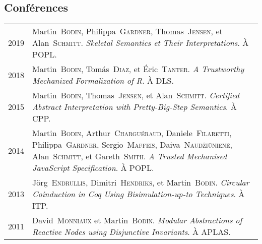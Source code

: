 \documentclass[12pt,a4paper]{article}
\makeatletter
\newenvironment{datecvsection}[1]%
               {\subsection*{#1}%
                 \noindent \begin{tabular}{@{}p{\annee}p{\texte}@{}}}
               {\end{tabular}}
\newcommand\familyName{\textsc}
\makeatother
\begin{document}
\begin{datecvsection}{Conférences}

  2019 & Martin~\familyName{Bodin}, Philippa~\familyName{Gardner}, Thomas~\familyName{Jensen}, et Alan~\familyName{Schmitt}. \textit{Skeletal Semantics et Their Interpretations}. À POPL. \\

  2018 & Martin~\familyName{Bodin}, Tomás~\familyName{Diaz}, et Éric~\familyName{Tanter}. \textit{A Trustworthy Mechanized Formalization of R}. À DLS. \\

  2015 & Martin~\familyName{Bodin}, Thomas~\familyName{Jensen}, et Alan~\familyName{Schmitt}. \textit{Certified Abstract Interpretation with Pretty-Big-Step Semantics}. À CPP. \\

  2014 & Martin~\familyName{Bodin}, Arthur~\familyName{Charguéraud}, Daniele~\familyName{Filaretti}, Philippa~\familyName{Gardner}, Sergio~\familyName{Maffeis}, Daiva~\familyName{Naudžiūnienė}, Alan~\familyName{Schmitt}, et Gareth~\familyName{Smith}. \textit{A Trusted Mechanised JavaScript Specification}. À POPL. \\

  2013 & Jörg~\familyName{Endrullis}, Dimitri~\familyName{Hendriks}, et Martin~\familyName{Bodin}. \textit{Circular Coinduction in Coq Using Bisimulation-up-to Techniques}. À ITP. \\

  2011 & David~\familyName{Monniaux} et Martin~\familyName{Bodin}. \textit{Modular Abstractions of Reactive Nodes using Disjunctive Invariants}. À APLAS. \\

\end{datecvsection}
\end{document}
